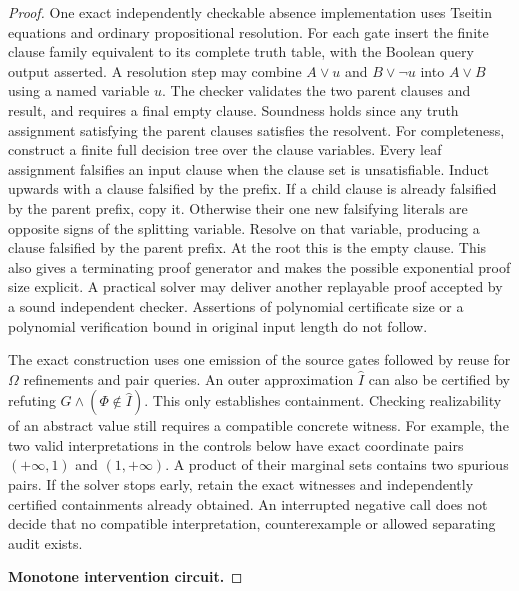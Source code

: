 \begin{proof}
One exact independently checkable absence implementation uses Tseitin equations and ordinary propositional resolution. For each gate insert the finite clause family equivalent to its complete truth table, with the Boolean query output asserted. A resolution step may combine \(A\vee u\) and \(B\vee\neg u\) into \(A\vee B\) using a named variable \(u\). The checker validates the two parent clauses and result, and requires a final empty clause. Soundness holds since any truth assignment satisfying the parent clauses satisfies the resolvent. For completeness, construct a finite full decision tree over the clause variables. Every leaf assignment falsifies an input clause when the clause set is unsatisfiable. Induct upwards with a clause falsified by the prefix. If a child clause is already falsified by the parent prefix, copy it. Otherwise their one new falsifying literals are opposite signs of the splitting variable. Resolve on that variable, producing a clause falsified by the parent prefix. At the root this is the empty clause. This also gives a terminating proof generator and makes the possible exponential proof size explicit. A practical solver may deliver another replayable proof accepted by a sound independent checker. Assertions of polynomial certificate size or a polynomial verification bound in original input length do not follow.

The exact construction uses one emission of the source gates followed by reuse for \(\Omega\) refinements and pair queries. An outer approximation \(\widehat I\) can also be certified by refuting \(G\land(\Phi\notin\widehat I)\). This only establishes containment. Checking realizability of an abstract value still requires a compatible concrete witness. For example, the two valid interpretations in the controls below have exact coordinate pairs \((+\infty,1)\) and \((1,+\infty)\). A product of their marginal sets contains two spurious pairs. If the solver stops early, retain the exact witnesses and independently certified containments already obtained. An interrupted negative call does not decide that no compatible interpretation, counterexample or allowed separating audit exists.

\textbf{Monotone intervention circuit.}


\end{proof}
